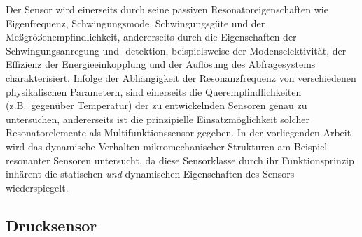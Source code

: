 Der Sensor wird einerseits
durch seine passiven Resonatoreigenschaften wie Eigenfrequenz,
Schwingungsmode, Schwingungsgüte und der Meßgrößenempfindlichkeit,
andererseits durch die Eigenschaften der Schwingungsanregung und
-detektion, beispielsweise der Modenselektivität, der Effizienz der
Energieeinkopplung und der Auflösung des Abfragesystems charakterisiert.
Infolge der Abhängigkeit der Resonanzfrequenz von verschiedenen
physikalischen Parametern, sind einerseits die Querempfindlichkeiten
(z.B.\ gegenüber Temperatur) der zu entwickelnden Sensoren genau zu
untersuchen, andererseits ist die prinzipielle Einsatzmöglichkeit solcher
Resonatorelemente als Multifunktionssensor gegeben. In der vorliegenden
Arbeit wird das dynamische
Verhalten mikromechanischer Strukturen am Beispiel resonanter Sensoren
untersucht, da diese Sensorklasse durch ihr Funktionsprinzip inhärent die
statischen {\em und} dynamischen Eigenschaften des Sensors wiederspiegelt.


\subsection{Drucksensor}
\label{drucksensor}

